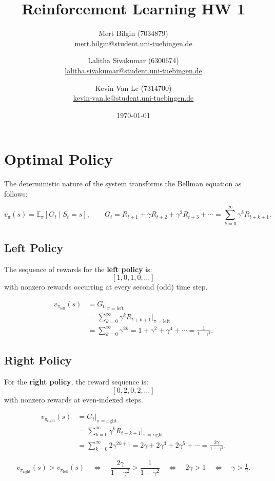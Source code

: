 \documentclass[11pt]{article}
\title{Reinforcement Learning HW 1}
\author{
Mert Bilgin (7034879) \\
\url{mert.bilgin@student.uni-tuebingen.de}
\and
Lalitha Sivakumar (6300674) \\
\url{lalitha.sivakumar@student.uni-tuebingen.de}
\and
Kevin Van Le (7314700) \\
\url{kevin-van.le@student.uni-tuebingen.de}
}
\date{\today}
\begin{document}
\maketitle

\section{Optimal Policy}

The deterministic nature of the system transforms the Bellman equation as follows:

\[
v_\pi(s) = \mathbb{E}_\pi \left[ G_t \mid S_t = s \right],
\qquad 
G_t = R_{t+1} + \gamma R_{t+2} + \gamma^2 R_{t+3} + \cdots
= \sum_{k=0}^{\infty} \gamma^k R_{t+k+1}.
\]

\subsection*{Left Policy}

The sequence of rewards for the \textbf{left policy} is:
\[
[1, 0, 1, 0, \dots]
\]
with nonzero rewards occurring at every second (odd) time step.

\[
\begin{aligned}
v_{\pi_{\text{left}}}(s) 
&= G_t \Big|_{\pi=\text{left}} \\
&= \sum_{k=0}^{\infty} \gamma^k R_{t+k+1}\Big|_{\pi=\text{left}} \\
&= \sum_{k=0}^{\infty} \gamma^{2k} 
= 1 + \gamma^2 + \gamma^4 + \cdots 
= \frac{1}{1 - \gamma^2}.
\end{aligned}
\]

\subsection*{Right Policy}

For the \textbf{right policy}, the reward sequence is:
\[
[0, 2, 0, 2, \dots]
\]
with nonzero rewards at even-indexed steps.

\[
\begin{aligned}
v_{\pi_{\text{right}}}(s)
&= G_t \Big|_{\pi=\text{right}} \\
&= \sum_{k=0}^{\infty} \gamma^k R_{t+k+1}\Big|_{\pi=\text{right}} \\
&= \sum_{k=0}^{\infty} 2\gamma^{2k+1} 
= 2\gamma + 2\gamma^3 + 2\gamma^5 + \cdots 
= \frac{2\gamma}{1 - \gamma^2}.
\end{aligned}
\]


\[
v_{\pi_{\text{right}}}(s) > v_{\pi_{\text{left}}}(s)
\quad \Longleftrightarrow \quad
\frac{2\gamma}{1 - \gamma^2} > \frac{1}{1 - \gamma^2}
\quad \Longleftrightarrow \quad
2\gamma > 1
\quad \Longleftrightarrow \quad
\gamma > \tfrac{1}{2}.
\]
\end{document}
